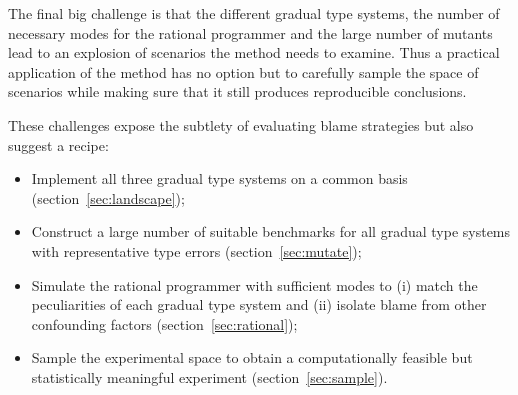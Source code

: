 The final big challenge is that the different gradual type
systems, the number of necessary modes for the rational programmer
and the large number of mutants lead to an explosion of scenarios the
method needs to examine. Thus a practical application of the
method has no option but to carefully sample the space of scenarios while 
making sure that it still produces reproducible conclusions.


\smallskip

These challenges expose the subtlety of evaluating blame strategies but
also suggest a recipe:


\begin{itemize}

\item Implement all three gradual type systems on a common
  basis (section~\ref{sec:landscape});

\item Construct a large number of suitable benchmarks for all gradual type
  systems with representative
  type errors  (section~\ref{sec:mutate}); 
    
\item Simulate the rational programmer with sufficient 
  modes to (i) match the peculiarities of each gradual type system and 
    (ii) isolate blame from other confounding factors
    (section~\ref{sec:rational});



\item Sample the experimental space  to obtain a computationally feasible
  but statistically meaningful experiment (section~\ref{sec:sample}).

\end{itemize}
